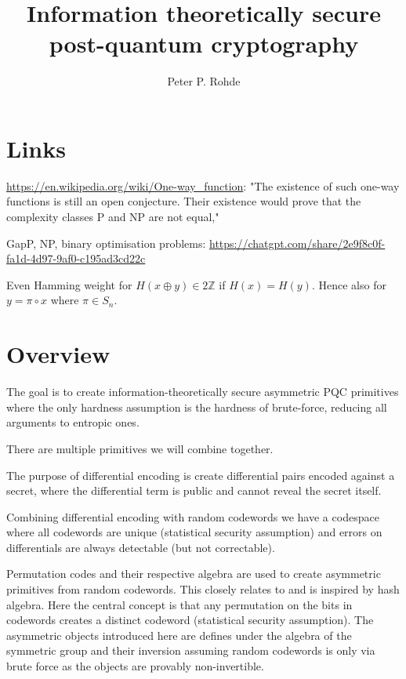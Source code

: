 \documentclass[twocolumn, aps, amsmath, amssymb, nofootinbib, superscriptaddress, longbibliography, doublefloatfix, table-of-contents, eqsecnum, rmp]{revtex4-2}
\begin{document}
\title{Information theoretically secure post-quantum cryptography}

\author{Peter P. Rohde}

\begin{abstract}
\end{abstract}

\maketitle


\section{Links}

\url{https://en.wikipedia.org/wiki/One-way_function}: "The existence of such one-way functions is still an open conjecture. Their existence would prove that the complexity classes P and NP are not equal,"

GapP, NP, binary optimisation problems: \url{https://chatgpt.com/share/2e9f8c0f-fa1d-4d97-9af0-c195ad3cd22c}

Even Hamming weight for $H(x\oplus y)\in 2\mathbb{Z}$ if $H(x)=H(y)$. Hence also for $y=\pi\circ x$ where $\pi\in S_n$.

\section{Overview}

The goal is to create information-theoretically secure asymmetric PQC primitives where the only hardness assumption is the hardness of brute-force, reducing all arguments to entropic ones.

There are multiple primitives we will combine together.

The purpose of differential encoding is create differential pairs encoded against a secret, where the differential term is public and cannot reveal the secret itself.

Combining differential encoding with random codewords we have a codespace where all codewords are unique (statistical security assumption) and errors on differentials are always detectable (but not correctable).

Permutation codes and their respective algebra are used to create asymmetric primitives from random codewords. This closely relates to and is inspired by hash algebra. Here the central concept is that any permutation on the bits in codewords creates a distinct codeword (statistical security assumption). The asymmetric objects introduced here are defines under the algebra of the symmetric group and their inversion assuming random codewords is only via brute force as the objects are provably non-invertible.
\end{document}
